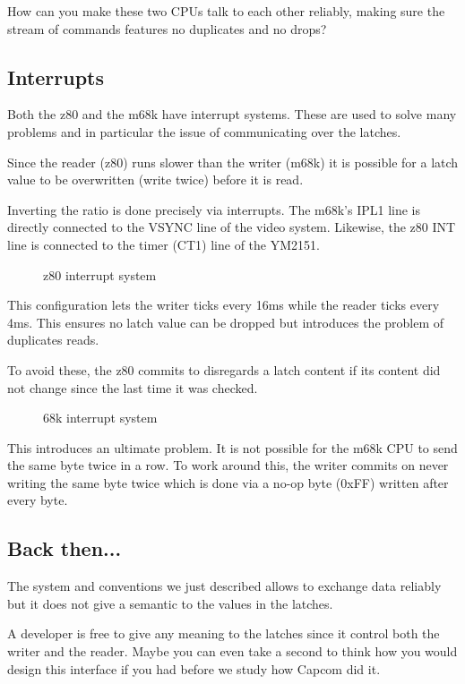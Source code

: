 How can you make these two CPUs talk to each other reliably, making sure the stream of commands features no duplicates and no drops?

\subsection{Interrupts}

Both the z80 and the m68k have interrupt systems. These are used to solve many problems and in particular the issue of communicating over the latches.

Since the reader (z80) runs slower than the writer (m68k) it is possible for a latch value to be overwritten (write twice) before it is read. 

Inverting the ratio is done precisely via interrupts. The m68k's IPL1 line is directly connected to the VSYNC line of the video system. Likewise, the z80 INT line is connected to the timer (CT1) line of the YM2151.

\begin{figure}[H]
\caption*{z80 interrupt system}
\end{figure}

This configuration lets the writer ticks every 16ms while the reader ticks every 4ms. This ensures no latch value can be dropped but introduces the problem of duplicates reads.

To avoid these, the z80 commits to disregards a latch content if its content did not change since the last time it was checked.

\begin{figure}[H]
\caption*{68k interrupt system}
\end{figure}

This introduces an ultimate problem. It is not possible for the m68k CPU to send the same byte twice in a row. To work around this, the writer commits on never writing the same byte twice which is done via a no-op byte (0xFF) written after every byte.




\subsection{Back then...}
The system and conventions we just described allows to exchange data reliably but it does not give a semantic to the values in the latches. 

A developer is free to give any meaning to the latches since it control both the writer and the reader. Maybe you can even take a second to think how you would design this interface if you had before we study how Capcom did it.

